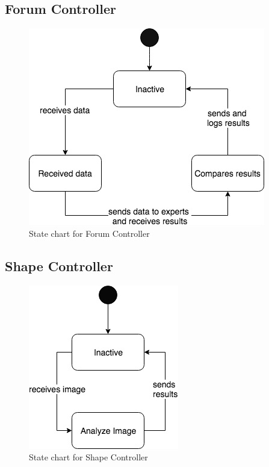 \documentclass[12pt,fleqn]{article}
\begin{document}
\subsection{Forum Controller}
\begin{figure}[H]
    \centering
    \includegraphics[scale=0.6]{img/Forum_Controller.png}
    \caption{State chart for Forum Controller}
\end{figure}

\subsection{Shape Controller}
\begin{figure}[H]
    \centering
    \includegraphics[scale=0.6]{img/Shape_Controller.png}
    \caption{State chart for Shape Controller}
\end{figure}
\end{document}
